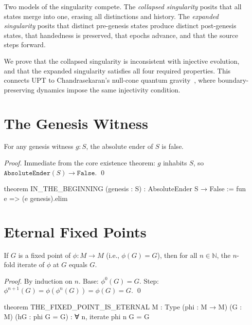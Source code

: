 Two models of the singularity compete. The \emph{collapsed singularity} posits that all states merge into one, erasing all distinctions and history. The \emph{expanded singularity} posits that distinct pre-genesis states produce distinct post-genesis states, that handedness is preserved, that epochs advance, and that the source steps forward.

We prove that the collapsed singularity is inconsistent with injective evolution, and that the expanded singularity satisfies all four required properties. This connects UPT to Chandrasekaran's null-cone quantum gravity~\cite{chandrasekaran2026}, where boundary-preserving dynamics impose the same injectivity condition.

\section{The Genesis Witness}

\begin{theorem}\label{thm:beginning}
For any genesis witness $g : S$, the absolute ender of $S$ is false.
\end{theorem}

\begin{proof}
Immediate from the core existence theorem: $g$ inhabits $S$, so $\texttt{AbsoluteEnder}(S) \to \texttt{False}$. \qed
\end{proof}

\begin{leancode}
theorem IN_THE_BEGINNING (genesis : S) :
    AbsoluteEnder S → False :=
    fun e => (e genesis).elim
\end{leancode}

\section{Eternal Fixed Points}

\begin{theorem}\label{thm:eternal}
If $G$ is a fixed point of $\phi : M \to M$ (i.e., $\phi(G) = G$), then for all $n \in \mathbb{N}$, the $n$-fold iterate of $\phi$ at $G$ equals $G$.
\end{theorem}

\begin{proof}
By induction on $n$. Base: $\phi^0(G) = G$. Step: $\phi^{n+1}(G) = \phi(\phi^n(G)) = \phi(G) = G$. \qed
\end{proof}

\begin{leancode}
theorem THE_FIXED_POINT_IS_ETERNAL {M : Type}
    (phi : M → M) (G : M) (hG : phi G = G) :
    ∀ n, iterate phi n G = G
\end{leancode}

